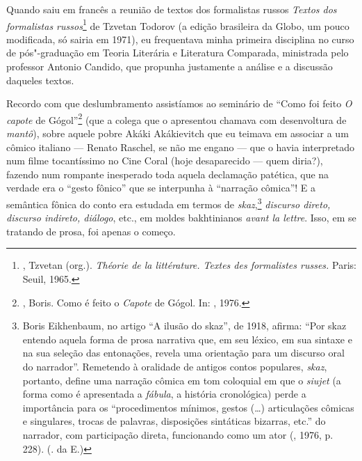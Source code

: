 {Quando saiu em francês a reunião de textos dos formalistas russos \emph{Textos dos formalistas
russos}\footnote{, 
Tzvetan (org.). \emph{Théorie de la littérature. Textes des 
formalistes russes.} Paris: Seuil, 1965.} de Tzvetan Todorov
(a edição brasileira da Globo, um pouco modificada, só sairia em 1971),
eu frequentava minha primeira disciplina no curso de pós"-graduação em Teoria Literária
e Literatura Comparada, ministrada pelo professor Antonio Candido, que propunha
justamente a análise e a discussão daqueles textos.


 Recordo com que deslumbramento assistíamos ao seminário de
``Como foi feito \emph{O capote} de Gógol''\footnote{, Boris.
 Como é feito o \emph{Capote} de Gógol. In: , 1976.} (que a colega que o
apresentou chamava com desenvoltura de \emph{mantô}), sobre aquele pobre Akáki
Akákievitch que eu teimava em associar a um cômico italiano --- Renato
Raschel, se não me engano --- que o havia interpretado num filme
tocantíssimo no Cine Coral (hoje desaparecido --- quem diria?), fazendo num rompante inesperado toda aquela declamação patética, que na
verdade era o ``gesto fônico'' que se interpunha à ``narração cômica''!
E a semântica fônica do conto era estudada em termos de \emph{skaz},\footnote{Boris Eikhenbaum, no artigo “A ilusão do skaz”,
 de 1918, afirma: ``Por skaz entendo aquela forma de prosa narrativa
 que, em seu léxico, em sua sintaxe e na sua seleção das entonações,
 revela uma orientação para um discurso oral do narrador''. Remetendo
 à oralidade de antigos contos populares, \emph{skaz}, portanto, 
define uma narração cômica em tom coloquial em que o \emph{siujet}
 (a forma como é apresentada a \emph{fábula}, a história cronológica)
 perde a importância para os ``procedimentos mínimos, gestos
 (\ldots{}) articulações cômicas e singulares, trocas de palavras,
 disposições sintáticas bizarras, etc.'' do narrador, com participação 
direta, funcionando como um ator (, 1976, p. 228).
 (. da {E}.)}
\emph{discurso direto, discurso indireto, diálogo}, etc., em moldes bakhtinianos
\emph{avant la lettre}. Isso, em se tratando de prosa, foi apenas o começo.


}
